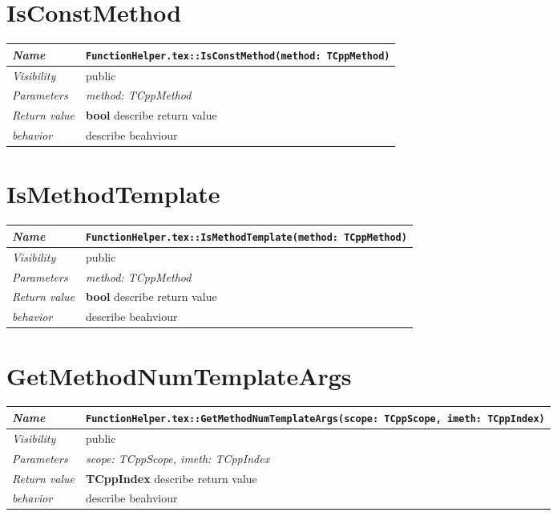  \section{IsConstMethod}
\begin{longtable}{p{3cm} @{\hskip 1cm} p{12cm}}
 \hline
\textit{Name} & \texttt{FunctionHelper.tex::IsConstMethod(method: TCppMethod)}\\
\hline
 \textit{Visibility} & public\\
\hline
\textit{Parameters} & \textit{method: TCppMethod}\\
\hline
\textit{Return value} & \textbf{ bool} describe return value\\
  \hline
 \textit{behavior} & describe beahviour \\
\hline
\end{longtable} \pagebreak
 \section{IsMethodTemplate}
\begin{longtable}{p{3cm} @{\hskip 1cm} p{12cm}}
 \hline
\textit{Name} & \texttt{FunctionHelper.tex::IsMethodTemplate(method: TCppMethod)}\\
\hline
 \textit{Visibility} & public\\
\hline
\textit{Parameters} & \textit{method: TCppMethod}\\
\hline
\textit{Return value} & \textbf{ bool} describe return value\\
  \hline
 \textit{behavior} & describe beahviour \\
\hline
\end{longtable} \pagebreak
 \section{GetMethodNumTemplateArgs}
\begin{longtable}{p{3cm} @{\hskip 1cm} p{12cm}}
 \hline
\textit{Name} & \texttt{FunctionHelper.tex::GetMethodNumTemplateArgs(scope: TCppScope, imeth: TCppIndex)}\\
\hline
 \textit{Visibility} & public\\
\hline
\textit{Parameters} & \textit{scope: TCppScope, imeth: TCppIndex}\\
\hline
\textit{Return value} & \textbf{ TCppIndex} describe return value\\
  \hline
 \textit{behavior} & describe beahviour \\
\hline
\end{longtable} \pagebreak
